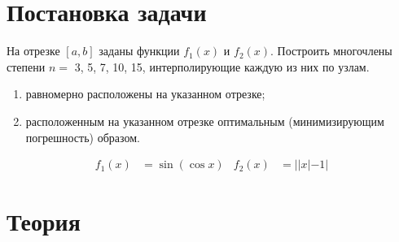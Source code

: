 \documentclass[12pt, a4paper]{article}
\begin{document}
	
	\begin{titlepage}
	\end{titlepage}
	
\tableofcontents
	
\section{Постановка задачи}
	
На отрезке $[a,b]$ заданы функции $f_1(x)$ и  $f_2(x)$. Построить многочлены степени $n =$ 3,  5,  7, 10, 15, интерполирующие каждую из них по узлам.
	
\begin{enumerate}
	\item равномерно расположены на указанном отрезке;
	\item расположенным на указанном отрезке оптимальным (минимизирующим погрешность) образом.
\end{enumerate}

\begin{align}
f_1(x) &= \sin(\cos x) & f_2(x) &= ||x| - 1|
\end{align}	

\section{Теория}
\end{document}
